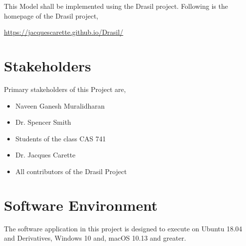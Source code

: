 \documentclass{article}
\begin{document}
This Model shall be implemented using the Drasil project. Following is the 
homepage of the Drasil project,

\url{https://jacquescarette.github.io/Drasil/} 

\section*{Stakeholders}
Primary stakeholders of this Project are,
\begin{itemize}
\item Naveen Ganesh Muralidharan
\item Dr. Spencer Smith
\item Students of the class CAS 741
\item Dr. Jacques Carette
\item All contributors of the Drasil Project
\end{itemize}

\section*{Software Environment}
The software application in this project is designed to execute on Ubuntu 18.04 
and Derivatives, Windows 10 and, macOS 10.13 and greater.
\end{document}
